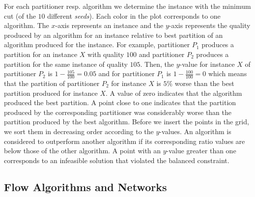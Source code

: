 For each partitioner resp. algorithm we determine the instance with the 
minimum cut (of the $10$ different \emph{seeds}). Each color in the plot corresponds to
one algorithm. The $x$-axis represents an instance and the $y$-axis represents the quality
produced by an algorithm for an instance relative to best partition of an algorithm produced for
the instance. For example, partitioner $P_1$ produces a partition for an instance $X$ with
quality $100$ and partitioner $P_2$ produces a partition for the same instance of quality $105$.
Then, the $y$-value for instance $X$ of partitioner $P_2$ is $1 - \frac{105}{100} = 0.05$ and
for partitioner $P_1$ is $1 - \frac{100}{100} = 0$ which means that the partition of partitioner $P_2$
for instance $X$ is $5\%$ worse than the best partition produced for instance $X$.
 A value of zero indicates that the algorithm
produced the best partition. A point close to one indicates that the partition produced by the 
corresponding partitioner was considerably worse than the partition produced by the best
algorithm. Before we insert the points in the grid, we sort them in decreasing order 
according to the $y$-values. An algorithm is considered to outperform another algorithm if its 
corresponding ratio values are below those of the other algorithm. A point with an $y$-value
greater than one corresponds to an infeasible solution that violated the balanced constraint.

\subsection{Flow Algorithms and Networks}
\label{sec:exp_flow_network}

